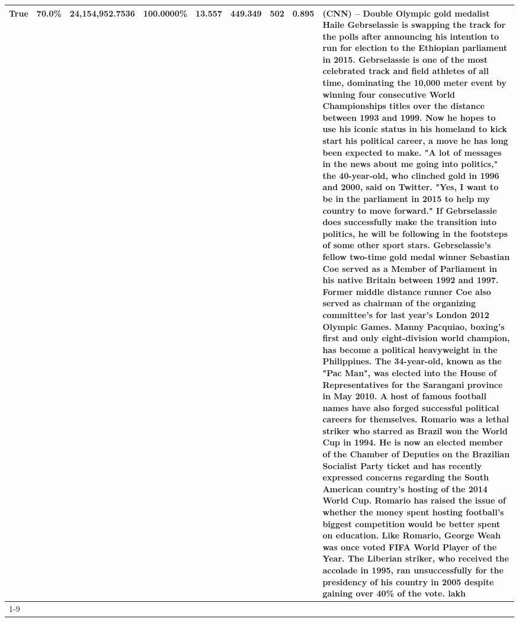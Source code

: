 \begin{table}[H]
{\begin{tabular}{lllrlllll}
True & 70.0\% & 24,154,952.7536 & \bfseries \color{red} 100.0000\% & 13.557 & 449.349 & 502 & 0.895 & (CNN) -- Double Olympic gold medalist Haile Gebrselassie is swapping the track for the polls after announcing his intention to run for election to the Ethiopian parliament in 2015. Gebrselassie is one of the most celebrated track and field athletes of all time, dominating the 10,000 meter event by winning four consecutive World Championships titles over the distance between 1993 and 1999. Now he hopes to use his iconic status in his homeland to kick start his political career, a move he has long been expected to make. "A lot of messages in the news about me going into politics," the 40-year-old, who clinched gold in 1996 and 2000, said on Twitter. "Yes, I want to be in the parliament in 2015 to help my country to move forward." If Gebrselassie does successfully make the transition into politics, he will be following in the footsteps of some other sport stars. Gebrselassie's fellow two-time gold medal winner Sebastian Coe served as a Member of Parliament in his native Britain between 1992 and 1997. Former middle distance runner Coe also served as chairman of the organizing committee's for last year's London 2012 Olympic Games. Manny Pacquiao, boxing's first and only eight-division world champion, has become a political heavyweight in the Philippines. The 34-year-old, known as the "Pac Man", was elected into the House of Representatives for the Sarangani province in May 2010. A host of famous football names have also forged successful political careers for themselves. Romario was a lethal striker who starred as Brazil won the World Cup in 1994. He is now an elected member of the Chamber of Deputies on the Brazilian Socialist Party ticket and has recently expressed concerns regarding the South American country's hosting of the 2014 World Cup. Romario has raised the issue of whether the money spent hosting football's biggest competition would be better spent on education. Like Romario, George Weah was once voted FIFA World Player of the Year. The Liberian striker, who received the accolade in 1995, ran unsuccessfully for the presidency of his country in 2005 despite gaining over 40\% of the vote. lakh \\
\cline{1-9}

\end{tabular}}
\end{table}
